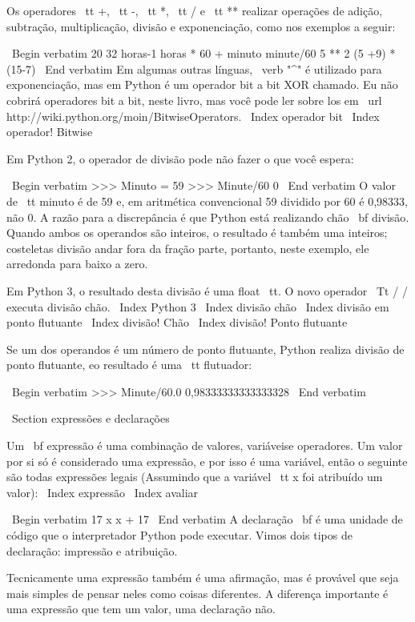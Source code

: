 \documentclass[10pt]{book}
\begin{document}
{Os operadores {\ tt +}, {\ tt -}, {\ tt *}, {\ tt /} e {\ tt **}
realizar operações de adição, subtração, multiplicação, divisão e
exponenciação, como nos exemplos a seguir:

\ Begin {verbatim}
20 32 horas-1 horas * 60 + minuto minute/60 5 ** 2 (5 +9) * (15-7)
\ End {verbatim}
%
Em algumas outras línguas, \ verb "^" é utilizado para exponenciação, mas
em Python é um operador bit a bit XOR chamado. Eu não cobrirá
operadores bit a bit, neste livro, mas você pode ler sobre
los em \ url {http://wiki.python.org/moin/BitwiseOperators}.
\ Index {operador bit}
\ Index {operador! Bitwise}

Em Python 2, o operador de divisão pode não fazer o que você espera:

\ Begin {verbatim}
>>> Minuto = 59
>>> Minute/60
0
\ End {verbatim}
%
O valor de {\ tt minuto} é de 59 e, em aritmética convencional 59
dividido por 60 é 0,98333, não 0. A razão para a discrepância é
que Python está realizando {chão \ bf divisão}.
Quando ambos os operandos são inteiros, o resultado é também uma
inteiros; costeletas divisão andar fora da fração
parte, portanto, neste exemplo, ele arredonda para baixo a zero.

Em Python 3, o resultado desta divisão é uma {float \ tt}. O novo operador
{\ Tt / /} executa divisão chão.
\ Index {Python 3}
\ Index {divisão chão}
\ Index {divisão em ponto flutuante}
\ Index {divisão! Chão}
\ Index {divisão! Ponto flutuante}

Se um dos operandos é um número de ponto flutuante, Python realiza
divisão de ponto flutuante, eo resultado é uma {\ tt flutuador}:

\ Begin {verbatim}
>>> Minute/60.0
0,98333333333333328
\ End {verbatim}


\ Section {expressões e declarações}

Um {\ bf expressão} é uma combinação de valores, variáveis ​​e operadores.
Um valor por si só é considerado uma expressão, e por isso é
uma variável, então o seguinte são todas expressões legais
(Assumindo que a variável {\ tt x} foi atribuído um valor):
\ Index {expressão}
\ Index {avaliar}

\ Begin {verbatim}
17
x
x + 17
\ End {verbatim}
%
A declaração {\ bf} é uma unidade de código que o interpretador Python pode
executar. Vimos dois tipos de declaração: impressão e
atribuição.

Tecnicamente uma expressão também é uma afirmação, mas é provável que seja
mais simples de pensar neles como coisas diferentes. A diferença importante
é uma expressão que tem um valor, uma declaração não.


}
\end{document}
